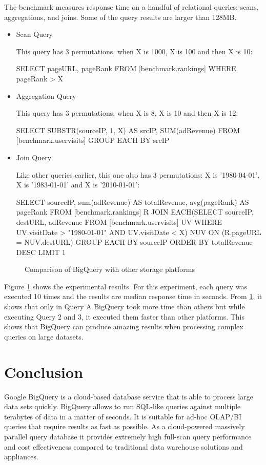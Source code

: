 \documentclass[9pt,twocolumn,twoside]{../../styles/osajnl}
\begin{document}
\noindent
The benchmark measures response time on a handful of relational
queries: scans, aggregations, and joins. Some of the query results are
larger than 128MB.
\begin{itemize}
\item Scan Query

This query has 3 permutations, when X is 1000, X is 100 and then X is 10:

SELECT pageURL, pageRank FROM [benchmark.rankings] WHERE pageRank > X


\item Aggregation Query

This query has 3 permutations, when X is 8, X is 10 and then X is 12:

SELECT SUBSTR(sourceIP, 1, X) AS srcIP, SUM(adRevenue)
FROM [benchmark.uservisits]
GROUP EACH BY srcIP


\item Join Query

Like other queries earlier, this one also has 3 permutations: X is ’1980-04-01’, X is ’1983-01-01’ and X is ’2010-01-01’:

SELECT sourceIP, sum(adRevenue) AS totalRevenue, avg(pageRank) AS pageRank
FROM [benchmark.rankings] R
JOIN EACH(SELECT sourceIP, destURL, adRevenue
FROM [benchmark.uservisits] UV WHERE UV.visitDate > "1980-01-01" AND UV.visitDate < X)
NUV ON (R.pageURL = NUV.destURL)
GROUP EACH BY sourceIP
ORDER BY totalRevenue DESC LIMIT 1
\end{itemize}
\begin{figure}[htbp]
\centering
{}
\caption{\cite{www-benchmarks-bigguery} Comparison of BigQuery with other storage platforms}
\label{fig:experiments}
\end{figure}

\noindent
Figure \ref{fig:experiments} shows the experimental results. For this
experiment, each query was executed 10 times and the results are
median response time in seconds. From \ref{fig:experiments}, it shows
that only in Query A BigQuery took more time than others but while
executing Query 2 and 3, it executed them faster than other
platforms. This shows that BigQuery can produce amazing results when
processing complex queries on large datasets.

\section{Conclusion}
Google BigQuery is a cloud-based database service that is able to
process large data sets quickly. BigQuery allows to run SQL-like
queries against multiple terabytes of data in a matter of seconds. It
is suitable for ad-hoc OLAP/BI \CE queries that require results as fast as
possible. As a cloud-powered massively parallel query database it
provides extremely high full-scan query performance and cost
effectiveness compared to traditional data warehouse solutions and
appliances.
\end{document}
